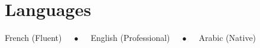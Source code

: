 \documentclass[letterpaper,11pt]{article}
\begin{document}
\section{Languages}
 \begin{itemize}[leftmargin=0.15in, label={}]
    \small{\item{
     French (Fluent) $\quad\bullet\quad$ English (Professional) $\quad\bullet\quad$ Arabic (Native)
    }}
 \end{itemize}
\end{document}
